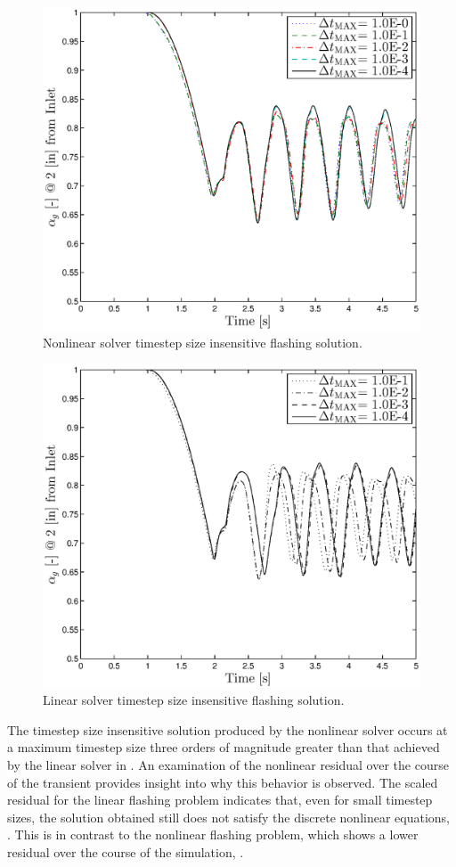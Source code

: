 \begin{figure}[h!bt]
\centering
\includegraphics[width=.6\textwidth]{plots/nln_flashing_1em0_1em1.eps}
\caption{Nonlinear solver timestep size insensitive flashing solution.}
\label{fig:nl_flashing_compare}
\end{figure}

\begin{figure}[h!tb]
\centering
\includegraphics[width=.6\textwidth]{plots/lin_flashing_1em1_1em4.eps}
\caption{Linear solver timestep size insensitive flashing solution.}
\label{fig:cobra_flashing_compare}
\end{figure}

The timestep size insensitive solution produced by the nonlinear solver occurs at a maximum timestep size three orders of magnitude greater than that achieved by the linear solver in \cobra{}.
An examination of the nonlinear residual over the course of the transient provides insight into why this behavior is observed.
The scaled residual for the linear flashing problem indicates that, even for small timestep sizes, the solution obtained still does not satisfy the discrete nonlinear equations, .
This is in contrast to the nonlinear flashing problem, which shows a lower residual over the course of the simulation, .

